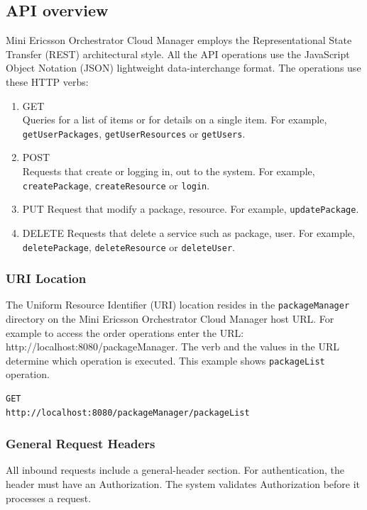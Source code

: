 \subsection{API overview}
Mini Ericsson Orchestrator Cloud Manager employs the Representational State Transfer (REST) architectural style. All the API operations use the JavaScript Object Notation (JSON) lightweight data-interchange format. The operations use these HTTP verbs:
\begin{enumerate}
    \item GET\\
    Queries for a list of items or for details on a single item. For example, \texttt{getUserPackages}, \texttt{getUserResources} or \texttt{getUsers}.
    \item POST\\
    Requests that create or logging in, out to the system. For example, \texttt{createPackage}, \texttt{createResource} or \texttt{login}.
    \item PUT
    Request that modify a package, resource. For example, \texttt{updatePackage}.
    \item DELETE
    Requests that delete a service such as package, user. For example, \texttt{deletePackage}, \texttt{deleteResource} or \texttt{deleteUser}.
\end{enumerate}

\subsubsection{URI Location}
The Uniform Resource Identifier (URI) location resides in the \texttt{packageManager} directory on the Mini Ericsson Orchestrator Cloud Manager host URL. For example to access the order operations enter the URL: http://localhost:8080/packageManager. The verb and the values in the URL determine which operation is executed. This example shows \texttt{packageList} operation.

\begin{lstlisting}[language={XML}]
GET
http://localhost:8080/packageManager/packageList
\end{lstlisting}

\subsubsection{General Request Headers}
All inbound requests include a general-header section. For authentication, the header must have an Authorization. The system validates Authorization before it processes a request.

